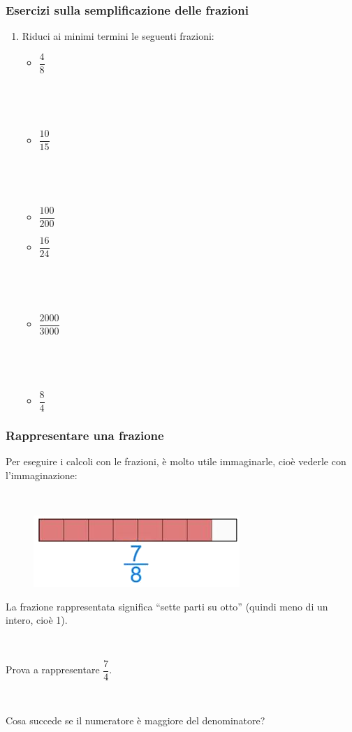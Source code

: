 \documentclass[]{beamer}
\theoremstyle{plain}
\begin{document}
\begin{frame}
  \frametitle{Esercizi sulla semplificazione delle frazioni}
  \begin{enumerate}
    \item Riduci ai minimi termini le seguenti frazioni:
    \begin{multicols}{2}
      \begin{itemize}
          \item $ \dfrac{4}{8} $
          
          ~

          ~
          \item $ \dfrac{10}{15} $
          
          ~

          ~
          \item $ \dfrac{100}{200} $
          \item $ \dfrac{16}{24} $
          
          ~

          ~
          \item $ \dfrac{2000}{3000} $
          
          ~

          ~
          \item $ \dfrac{8}{4} $
      \end{itemize}
    \end{multicols}
  \end{enumerate}
  \end{frame}
  


\begin{frame}
\frametitle{Rappresentare una frazione}
Per eseguire i calcoli con le frazioni, è molto utile \alert{immaginarle}, cioè vederle con l'immaginazione:

~
\begin{figure}
  \includegraphics[width=.5\columnwidth]{img/fraz.png}
\end{figure}

La frazione rappresentata significa ``sette parti su otto'' (quindi meno di un intero, cioè 1).\pause

~

Prova a rappresentare $ \dfrac{7}{4} $. \pause

~

Cosa succede se il numeratore è maggiore del denominatore?
\end{frame}
\end{document}
